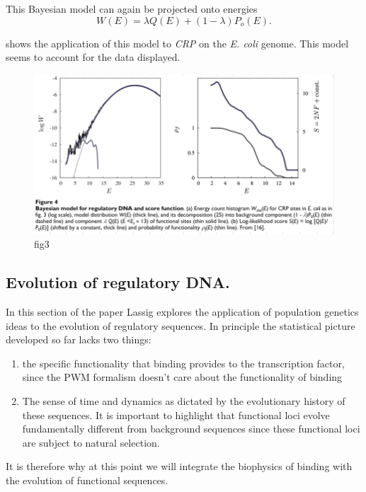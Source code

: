 This Bayesian model can again be projected onto energies
\begin{equation}
  W(E) = \lambda Q(E) + (1 - \lambda) P_o(E).
\end{equation}

 shows the application of this model to {\it CRP} on the
{\it E. coli} genome. This model seems to account for the data displayed.

\begin{figure}[h!]
	\centering \includegraphics[scale=0.5]{../fig/lassig_2007/fig4.png}
	\caption{fig3}
  \label{fig_bayesian_dna}
\end{figure}

\subsection{Evolution of regulatory DNA.}

In this section of the paper Lassig explores the application of population
genetics ideas to the evolution of regulatory sequences. In principle the
statistical picture developed so far lacks two things:
\begin{enumerate}
  \item the specific functionality that binding provides to the transcription
  factor, since the PWM formalism doesn't care about the functionality of
  binding
  \item The sense of time and dynamics as dictated by the evolutionary history
  of these sequences. It is important to highlight that functional loci evolve
  fundamentally different from background sequences since these functional loci
  are subject to natural selection.
\end{enumerate}
It is therefore why at this point we will integrate the biophysics of binding
with the evolution of functional sequences.

